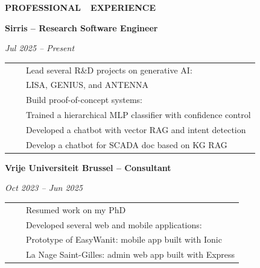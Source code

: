 \documentclass[a4paper,11pt,english]{article}
\newcommand{\RightColumn}[0]{10.5cm}
\newcommand{\ItemSkip}[0]{4pt}
\newcommand{\SubItemSkip}[0]{0pt}
\newcommand{\Bullet}[0]{\faCaretRight~~}
\newcommand{\BeginSubRubricSkip}[0]{6pt}
\newcommand{\EndSubRubric}[0]{\vspace{4pt}}
\newcommand{\Rubric}[1]{\colorbox{gray!20}{\parbox{\linewidth}{\centering\sffamily\bfseries{}#1}}}
\newcommand{\SubRubric}[1]{\parbox{\linewidth}{\sffamily\bfseries{}#1}}
\begin{document}
\begin{minipage}[t]{\RightColumn}
\vspace{-18pt}\Rubric{\faBriefcase \quad PROFESSIONAL~~EXPERIENCE}\vspace{16pt}

\SubRubric{Sirris -- Research Software Engineer}
\emph{Jul 2025 -- Present} \\[\BeginSubRubricSkip]
\begin{tabularx}{\linewidth}{@{}l@{}l@{}}
\Bullet & Lead several R\&D projects on generative AI: \\[\SubItemSkip]
& \quad LISA, GENIUS, and ANTENNA \\[\ItemSkip]
\Bullet & Build proof-of-concept systems: \\[\SubItemSkip]
& \quad Trained a hierarchical MLP classifier with confidence control \\[\SubItemSkip]
& \quad Developed a chatbot with vector RAG and intent detection \\[\SubItemSkip]
& \quad Develop a chatbot for SCADA doc based on KG RAG \\[\SubItemSkip]
\end{tabularx}
\EndSubRubric{}

\SubRubric{Vrije Universiteit Brussel -- Consultant}
\emph{Oct 2023 -- Jun 2025} \\[\BeginSubRubricSkip]
\begin{tabularx}{\linewidth}{@{}l@{}l@{}}
\Bullet & Resumed work on my PhD \\[\ItemSkip]
\Bullet & Developed several web and mobile applications: \\[\SubItemSkip]
& \quad Prototype of EasyWanit: mobile app built with Ionic \\[\SubItemSkip]
& \quad La Nage Saint-Gilles: admin web app built with Express \\[\ItemSkip]
\end{tabularx}
\EndSubRubric{}


\end{minipage}
\end{document}
